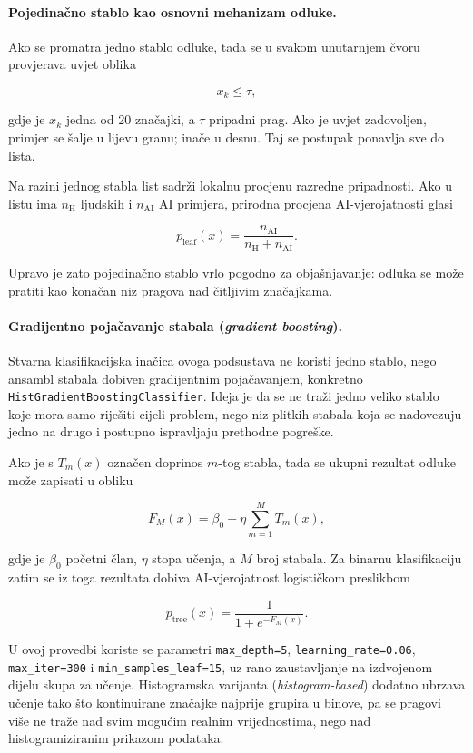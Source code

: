 \documentclass{article}
\begin{document}
\paragraph{Pojedinačno stablo kao osnovni mehanizam odluke.}
Ako se promatra jedno stablo odluke, tada se u svakom unutarnjem čvoru provjerava uvjet oblika

\[
x_k \le \tau,
\]

gdje je $x_k$ jedna od 20 značajki, a $\tau$ pripadni prag. Ako je uvjet zadovoljen, primjer se šalje u lijevu granu; inače u desnu. Taj se postupak ponavlja sve do lista.

Na razini jednog stabla list sadrži lokalnu procjenu razredne pripadnosti. Ako u listu ima $n_{\mathrm{H}}$ ljudskih i $n_{\mathrm{AI}}$ AI primjera, prirodna procjena AI-vjerojatnosti glasi

\[
p_{\mathrm{leaf}}(x)=\frac{n_{\mathrm{AI}}}{n_{\mathrm{H}}+n_{\mathrm{AI}}}.
\]

Upravo je zato pojedinačno stablo vrlo pogodno za objašnjavanje: odluka se može pratiti kao konačan niz pragova nad čitljivim značajkama.

\paragraph{Gradijentno pojačavanje stabala (\textit{gradient boosting}).}
Stvarna klasifikacijska inačica ovoga podsustava ne koristi jedno stablo, nego ansambl stabala dobiven gradijentnim pojačavanjem, konkretno \texttt{HistGradientBoostingClassifier}. Ideja je da se ne traži jedno veliko stablo koje mora samo riješiti cijeli problem, nego niz plitkih stabala koja se nadovezuju jedno na drugo i postupno ispravljaju prethodne pogreške.

Ako je s $T_m(x)$ označen doprinos $m$-tog stabla, tada se ukupni rezultat odluke može zapisati u obliku

\[
F_M(x)=\beta_0 + \eta \sum_{m=1}^{M} T_m(x),
\]

gdje je $\beta_0$ početni član, $\eta$ stopa učenja, a $M$ broj stabala. Za binarnu klasifikaciju zatim se iz toga rezultata dobiva AI-vjerojatnost logističkom preslikbom

\[
p_{\mathrm{tree}}(x)=\frac{1}{1+e^{-F_M(x)}}.
\]

U ovoj provedbi koriste se parametri \texttt{max\_depth=5}, \texttt{learning\_rate=0.06}, \texttt{max\_iter=300} i \texttt{min\_samples\_leaf=15}, uz rano zaustavljanje na izdvojenom dijelu skupa za učenje. Histogramska varijanta (\textit{histogram-based}) dodatno ubrzava učenje tako što kontinuirane značajke najprije grupira u binove, pa se pragovi više ne traže nad svim mogućim realnim vrijednostima, nego nad histogramiziranim prikazom podataka.
\end{document}
